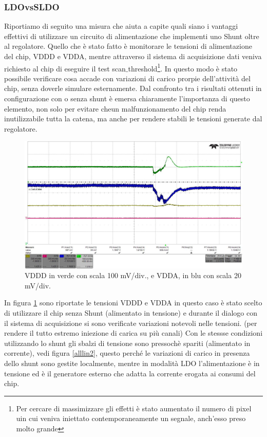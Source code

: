 \subsubsection{LDOvsSLDO}
Riportiamo di seguito una misura che aiuta a capite quali siano i vantaggi effettivi di utilizzare un circuito di alimentazione che implementi uno Shunt oltre al regolatore. Quello che è stato fatto è monitorare le tensioni di alimentazione del chip, VDDD e VDDA, mentre attraverso il sistema di acquisizione dati veniva richiesto al chip di eseguire il test scan$\_$threshold\footnote{Per cercare di massimizzare gli effetti è stato aumentato il numero di pixel uin cui veniva iniettato contemporaneamente un segnale, anch'esso preso molto grande}. 
In questo modo è stato possibile verificare cosa accade con variazioni di carico prorpie dell'attività del chip, senza doverle simulare esternamente. 
Dal confronto tra i risultati ottenuti in configurazione con o senza shunt è emersa chiaramente l'importanza di questo elemento, non solo per evitare cheun malfunzionamento del chip renda inutilizzabile tutta la catena, ma anche per rendere stabili le tensioni generate dal regolatore. 
\begin{figure}
\centering
\includegraphics[scale=.3]{Immagini/alllin1}
\caption{VDDD in verde con scala 100 mV/div., e VDDA, in blu con scala 20 mV/div.}
\label{alllin1}
\end{figure}
In figura \ref{alllin1} sono riportate le tensioni VDDD e VDDA in questo caso è stato scelto di utilizzare il chip senza Shunt (alimentato in tensione) e durante il dialogo con il sistema di acquisizione si sono verificate variazioni notevoli nelle tensioni. (per rendere il tutto estremo iniezione di carica su più canali) Con le stessse condizioni utilizzando lo shunt gli sbalzi di tensione sono pressochè spariti (alimentato in corrente), vedi figura \ref{alllin2}, questo perché le variazioni di carico in presenza dello shunt sono gestite localmente, mentre in modalità LDO l'alimentazione è in tensione ed è il generatore esterno che adatta la corrente erogata ai consumi del chip.
